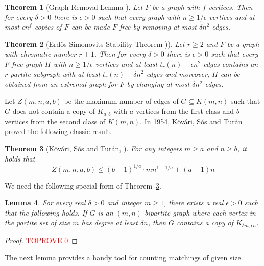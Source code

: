 \documentclass[10pt]{article}
\newtheorem{theorem}{Theorem}[section]
\newtheorem{lemma}[theorem]{Lemma}
\begin{document}
\begin{theorem}[Graph Removal Lemma \cite{Komlos1996}]\label{removal lemma} Let $F$ be a graph with $f$ vertices. Then for every $\delta>0$ there is $\epsilon>0$ such that every graph with $n\geq 1/\epsilon$ vertices and at most $\epsilon n^f$ copies of $F$ can be made $F$-free by removing at most $\delta n^2$ edges.
\end{theorem}

\begin{theorem}[Erd\H{o}s-Simonovits Stability Theorem \cite{erdHos1967,erdHos1968,Simonovits1968})]\label{stability theorem}
Let $r\geq2$ and $F$ be a graph with chromatic number $r+1$.
Then for every $\delta>0$ there is $\epsilon >0$ such that every $F$-free graph $H$ with $n\geq1/\epsilon$ vertices and at least $t_r(n)-\epsilon n^2$ edges contains an $r$-partite subgraph with at least $t_r(n)-\delta n^2$ edges and
moreover, $H$ can be obtained from an extremal graph for $F$ by changing at most $\delta n^2$ edges.
\end{theorem}


Let $Z(m,n,a,b)$ be the maximum number of edges of $G\subseteq K(m,n)$ such that $G$ does not contain a copy of $K_{a,b}$ with $a$ vertices from the first class and $b$ vertices from the second class of $K(m,n)$. In 1954, K\"{o}v\'{a}ri, S\'{o}s and Tur\'{a}n \cite{Kovari1954} proved the following classic result.

\begin{theorem}[K\"{o}v\'{a}ri, S\'{o}s and Tur\'{a}n, \cite{Kovari1954}]\label{Kab in bipartite graph}
For any integers $m\geq a$ and $n\geq b$, it holds that
$$Z(m,n,a,b)\leq (b-1)^{1/a}\cdot m n ^{1-1/a} + (a-1)n$$
\end{theorem}


We need the following special form of Theorem~\ref{Kab in bipartite graph}.

\begin{lemma}\label{bipartite graph with large degree contain bipartite complete graph}
For every real $\delta>0$ and integer $m\geq 1$, there exists a real $\epsilon>0$ such that the following holds.
If $G$ is an $(m,n)$-bipartite graph where each vertex in the partite set of size $m$ has degree at least $\delta n$,
then $G$ contains a copy of $K_{\delta m,\epsilon n}$.
\end{lemma}
\begin{proof}\textcolor{red}{TOPROVE 0}\end{proof}

The next lemma provides a handy tool for counting matchings of given size. 
\end{document}
